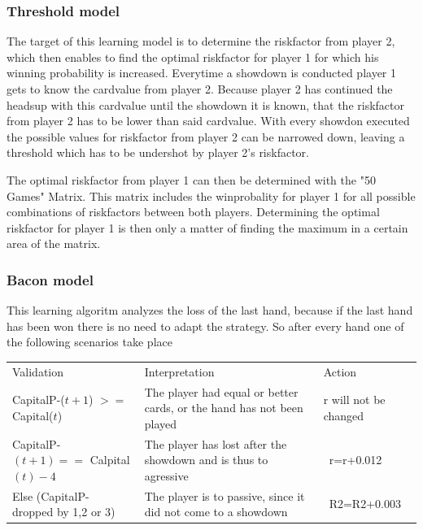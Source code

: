 \documentclass[11pt]{article}
\begin{document}
\subsubsection{Threshold model}

The target of this learning model is to determine the riskfactor from player 2, which then enables to find the optimal riskfactor for player 1 for which his winning probability is increased.
Everytime a showdown is conducted player 1 gets to know the cardvalue from player 2. Because player 2 has continued the headsup with this cardvalue until the showdown it is known, that the riskfactor from player 2 has to be lower than said cardvalue. With every showdon executed the possible values for riskfactor from player 2 can be narrowed down, leaving a threshold which has to be undershot by player 2's riskfactor.


The optimal riskfactor from player 1 can then be determined with the "50 Games" Matrix. This matrix includes the winprobality for player 1 for all possible combinations of riskfactors between both players. Determining the optimal riskfactor for player 1 is then only a matter of finding the maximum in a certain area of the matrix.




\subsubsection{Bacon model}
This learning algoritm analyzes the loss of the last hand, because if the last hand has been won there is no need to adapt the strategy. So after every hand one of the following scenarios take place\\
\renewcommand{\arraystretch}{1.4}
\begin{tabular}{ p{6.45cm}   p{5.1cm}  p{2.4cm}}
Validation & Interpretation & Action\\
\addlinespace
CapitalP-($t+1$) $>=$ Capital($t$) &	The player had equal or better cards, or the hand has not been played&
r will not be changed \\
\addlinespace
CapitalP-$(t+1) ==$ Calpital$(t)-4$	&	The player has lost after the showdown and is thus to agressive & \ r=r+0.012\\
\addlinespace
Else (CapitalP- dropped by 1,2 or 3) &	The player is to passive, since it did not come to a showdown & \ R2=R2+0.003\\


\end{tabular}
\end{document}
